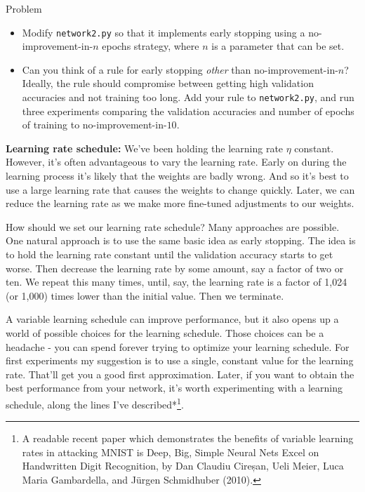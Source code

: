 \begin{exerciseBox}{Problem}


\begin{itemize}

\item Modify \texttt{network2.py} so that it implements early stopping using a no-improvement-in-$n$ epochs strategy, where $n$ is a parameter that can be set.

\item Can you think of a rule for early stopping \emph{other} than no-improvement-in-$n$? Ideally, the rule should compromise between getting high validation accuracies and not training too long. Add your rule to \texttt{network2.py}, and run three experiments comparing the validation accuracies and number of epochs of training to no-improvement-in-$10$.

\end{itemize}


\textbf{Learning rate schedule:} We've been holding the learning rate $\eta$ constant. However, it's often advantageous to vary the learning rate. Early on during the learning process it's likely that the weights are badly wrong. And so it's best to use a large learning rate that causes the weights to change quickly. Later, we can reduce the learning rate as we make more fine-tuned adjustments to our weights.


How should we set our learning rate schedule? Many approaches are possible. One natural approach is to use the same basic idea as early stopping. The idea is to hold the learning rate constant until the validation accuracy starts to get worse. Then decrease the learning rate by some amount, say a factor of two or ten. We repeat this many times, until, say, the learning rate is a factor of 1,024 (or 1,000) times lower than the initial value. Then we terminate.


A variable learning schedule can improve performance, but it also opens up a world of possible choices for the learning schedule. Those choices can be a headache - you can spend forever trying to optimize your learning schedule. For first experiments my suggestion is to use a single, constant value for the learning rate. That'll get you a good first approximation. Later, if you want to obtain the best performance from your network, it's worth experimenting with a learning schedule, along the lines I've described*\footnote{A readable recent paper which demonstrates the benefits of variable learning rates in attacking MNIST is Deep, Big, Simple Neural Nets Excel on Handwritten Digit Recognition, by Dan Claudiu Cireșan, Ueli Meier, Luca Maria Gambardella, and Jürgen Schmidhuber (2010).}.

\end{exerciseBox}



